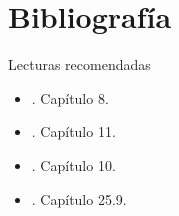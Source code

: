 \documentclass[9pt, aspectratio=169]{beamer}
\begin{document}
\section*{Bibliografía}
\begin{frame}{Lecturas recomendadas}
  \begin{itemize}
    \item {}. Capítulo 8.
    \item {}. Capítulo 11.
    \item {}. Capítulo 10.
    \item {}. Capítulo 25.9.
  \end{itemize}
\end{frame}
\end{document}
